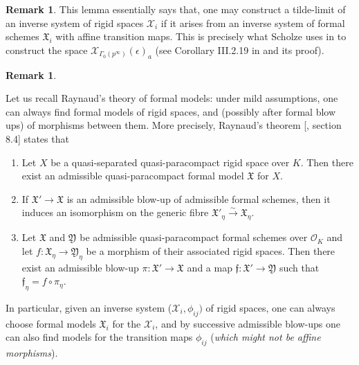 \documentclass[10pt,oneside]{amsart}
\theoremstyle{definition}
\newtheorem{remark}[theorem]{Remark}
\begin{document}
	\begin{remark}
	This lemma essentially says that, one may construct a tilde-limit of an inverse system of rigid spaces $\mathcal X_i$ if it arises from an inverse system of formal schemes $\mathfrak X_i$ with affine transition maps. This is precisely what Scholze uses in \cite{torsion} to construct the space $\mathcal X_{\Gamma_0(p^\infty)}(\epsilon)_a$ (see Corollary III.2.19 in \cite{torsion} and its proof).
	\end{remark}
	
	
 	\begin{remark} \label{Raynaud theory main theorem}
			
	Let us recall Raynaud's theory of formal models: under mild assumptions,
	one can always find formal models of rigid spaces, and (possibly after formal blow ups) of morphisms between them. More precisely, Raynaud's theorem [\cite{Bosch lectures}, section 8.4] states that
		
		\begin{enumerate}
			\item Let $X$ be a quasi-separated quasi-paracompact rigid space over $K$. Then there exist an admissible quasi-paracompact formal model $\mathfrak X$ for $X$.
			\item If $\mathfrak X'\rightarrow \mathfrak X$ is an admissible blow-up of admissible formal schemes, then it induces an isomorphism on the generic fibre  $\mathfrak X'_\eta \xrightarrow{\sim} \mathfrak X_\eta$.
			\item Let $\mathfrak X$ and $\mathfrak Y$ be admissible quasi-paracompact formal schemes over $\mathcal O_K$ and let $f:\mathfrak X_\eta \rightarrow \mathfrak Y_\eta$ be a morphism of their associated rigid spaces. Then there exist an admissible blow-up $\pi:\mathfrak X'\rightarrow \mathfrak X$ and a map $\mathfrak f:\mathfrak X'\rightarrow \mathfrak Y$ such that $\mathfrak f_\eta = f\circ \pi_\eta$.
		\end{enumerate}
		In particular, given an inverse system ($\mathcal X_i,\phi_{ij})$ of rigid spaces, one can always choose formal models $\mathfrak X_i$ for the $\mathcal X_i$, and by successive admissible blow-ups one can also find models for the transition maps $\phi_{ij}$ (\textit{which might not be affine morphisms}). 
		\end{remark}
\end{document}

